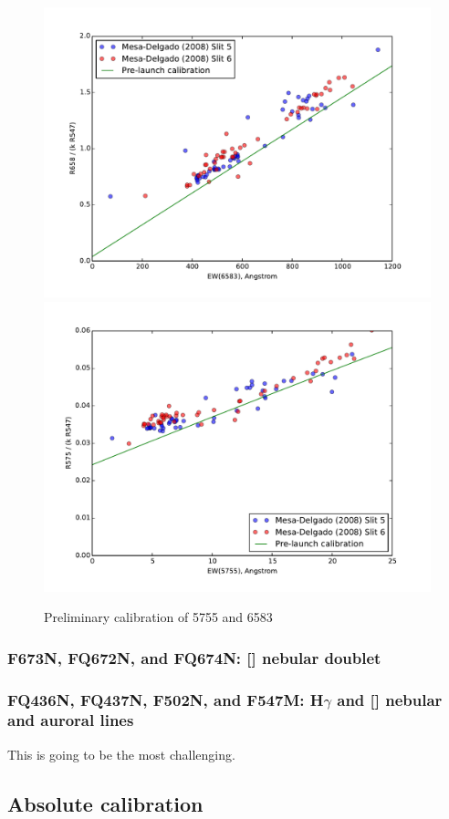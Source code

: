 \documentclass[preprint, 10pt]{aastex}
\newcommand\oiii{[\ion{O}{3}]}
\newcommand\sii{[\ion{S}{2}]}
\begin{document}
\begin{figure}
  \centering
  \includegraphics[width=0.8\linewidth]{adal-w6583-calibration}
  \includegraphics[width=0.8\linewidth]{adal-w5755-calibration}
  \caption{Preliminary calibration of 5755 and 6583}
  \label{fig:adal}
\end{figure}

\subsubsection{F673N, FQ672N, and FQ674N: \sii{} nebular doublet}
\label{sec:673-672-674}

\subsubsection{FQ436N, FQ437N, F502N, and F547M: H\(\gamma\) and
  \oiii{} nebular and auroral lines}
\label{sec:437}
This is going to be the most challenging. 


\subsection{Absolute calibration}
\label{sec:absolute}
\end{document}
